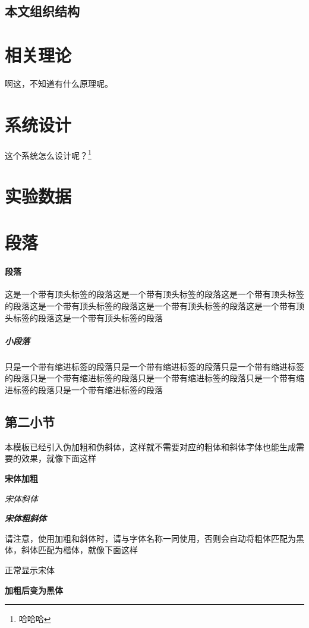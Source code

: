 \documentclass[supercite]{HustGraduPaper}
\begin{document}
\subsection{本文组织结构}

\section{相关理论}

啊这，不知道有什么原理呢。

\section{系统设计}

这个系统怎么设计呢？\footnote{哈哈哈}

\section{实验数据}

\section{段落}
\paragraph{段落}\label{para:para}这是一个带有顶头标签的段落这是一个带有顶头标签的段落这是一个带有顶头标签的段落这是一个带有顶头标签的段落这是一个带有顶头标签的段落这是一个带有顶头标签的段落这是一个带有顶头标签的段落
\subparagraph{小段落}\label{subpara:subpara}只是一个带有缩进标签的段落只是一个带有缩进标签的段落只是一个带有缩进标签的段落只是一个带有缩进标签的段落只是一个带有缩进标签的段落只是一个带有缩进标签的段落只是一个带有缩进标签的段落
\subsection{第二小节}
本模板已经引入伪加粗和伪斜体，这样就不需要对应的粗体和斜体字体也能生成需要的效果，就像下面这样

{\songti \bfseries 宋体加粗}

{\songti \itshape 宋体斜体}

{\songti \bfseries \itshape 宋体粗斜体}

请注意，使用加粗和斜体时，请与字体名称一同使用，否则会自动将粗体匹配为黑体，斜体匹配为楷体，就像下面这样

{正常显示宋体}

{\bfseries 加粗后变为黑体}
\end{document}
